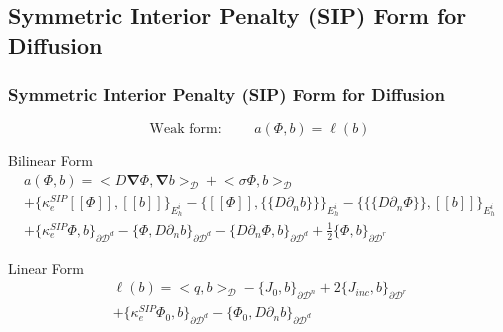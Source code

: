 \documentclass[compress,10pt]{beamer}
\renewcommand{\vec}[1]{\mathbf{#1}}
\begin{document}
\subsection{Symmetric Interior Penalty (SIP) Form for Diffusion}
\typeout{***********************************************************************************}
\begin{frame}[t]\frametitle{Symmetric Interior Penalty (SIP) Form for Diffusion}


\[
\text{Weak form: } \qquad a(\Phi,b) = \ell(b)
\]

\begin{block}{Bilinear Form}{\small
		\begin{gather*}
			 a( \Phi, b)  = \Big<  D \vec{\nabla}  \Phi , \vec{\nabla} b  \Big>_{\mathcal{D}} + \Big<  \sigma   \Phi ,  b  \Big>_{\mathcal{D}}    \\
			+  \Big\{ \kappa_e^{SIP} [\![   \Phi ]\!] , [\![  b ]\!]\Big\}_{E_h^i} - \Big\{  [\![   \Phi ]\!] , \{\!\{  D \partial_n b \}\!\}\Big\}_{E_h^i} -\Big\{ \{\!\{  D \partial_n  \Phi \}\!\} , [\![ b ]\!]\Big\}_{E_h^i} \\
			+ \Big\{ \kappa_e^{SIP}   \Phi ,   b \Big\}_{\partial \mathcal{D}^d} - \Big\{   \Phi  ,  D \partial_n b \Big\}_{\partial \mathcal{D}^d} - \Big\{   D 				\partial_n  \Phi ,   b \Big\}_{\partial \mathcal{D}^d}  +  \frac{1}{2} \Big\{    \Phi ,   b \Big\}_{\partial \mathcal{D}^r}
        	\end{gather*} }
\end{block}

\begin{block}{Linear Form}{\small
		\begin{align*}
			\ell (b) = \Big<  q, b  \Big>_{\mathcal{D}}  - \Big\{   J_{0}, b  \Big\}_{\partial \mathcal{D}^n} +  2 \Big\{   J_{inc}, b  \Big\}_{\partial 				\mathcal{D}^r} \\ + \Big\{ \kappa_e^{SIP}   \Phi_0 ,   b \Big\}_{\partial \mathcal{D}^d} - \Big\{   \Phi_0  ,  D \partial_n b \Big\}_{\partial 					\mathcal{D}^d} 
        	\end{align*} }
    \end{block}
\end{frame}
\end{document}
